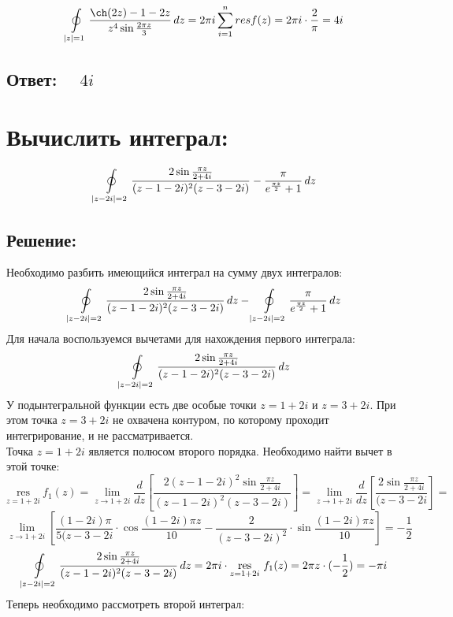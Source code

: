 \documentclass{article}
\begin{document}
         \[
        \ointop_{|z| = 1} \frac{\ch(2z) - 1 - 2z}{z^4 \sin{\frac{2\pi z}{3}}} \, dz = 2\pi i \sum\limits_{i=1}^{n} resf(z) = 2\pi i \cdot \frac{2}{\pi} = 4i
        \]
        
        
	\subsection{Ответ: $\quad 4i$}

        \section{Вычислить интеграл: 
         }
         \[
        \ointop_{|z - 2i| = 2} \frac{2\sin{\frac{\pi z}{2 + 4i}}}{(z - 1 - 2i)^2 (z - 3 - 2i)} - \frac{\pi}{e^{\frac{\pi z}{2}} + 1} \, dz
        \]
        \subsection{Решение:}
        Необходимо разбить имеющийся интеграл на сумму двух интегралов:
        \[
        \ointop_{|z - 2i| = 2} \frac{2\sin{\frac{\pi z}{2 + 4i}}}{(z - 1 - 2i)^2 (z - 3 - 2i)}\, dz - \ointop_{|z - 2i| = 2}  \frac{\pi}{e^{\frac{\pi z}{2}} + 1} \, dz
        \]
        Для начала воспользуемся вычетами для нахождения первого интеграла:
        \[
        \ointop_{|z - 2i| = 2} \frac{2\sin{\frac{\pi z}{2 + 4i}}}{(z - 1 - 2i)^2 (z - 3 - 2i)}\, dz 
        \]
        У подынтегральной функции есть две особые точки $z = 1 + 2i$ и $z = 3 + 2i$. При этом точка $z = 3 + 2i$ не охвачена контуром, по которому проходит интегрирование, и не рассматривается. \\
        Точка $z = 1 + 2i$ является полюсом второго порядка. Необходимо найти вычет в этой точке: 
        $$\underset{z = 1 + 2i}{\text{res}}\ f_1(z) = \lim\limits_{z\rightarrow 1 + 2i}  \frac{d}{dz} \left[ \frac{2(z - 1 - 2i)^2 \sin{\frac{\pi z}{2 + 4i}}}{(z - 1 - 2i)^2 (z - 3 - 2i)} \right] =\lim\limits_{z\rightarrow 1 + 2i}  \frac{d}{dz} \left[\frac{2\sin{\frac{\pi z}{2 + 4i}}}{(z - 3 - 2i}  \right] = $$
        $$\lim\limits_{z\rightarrow 1 + 2i} \left[ \frac{(1 - 2i)\pi}{5(z - 3 - 2i} \cdot \cos{\frac{(1 - 2i)\pi z}{10}} - \frac{2}{(z - 3 - 2i)^2}\cdot \sin{\frac{(1 - 2i)\pi z}{10}} \right]= -\frac{1}{2}  $$
         \[
        \ointop_{|z - 2i| = 2} \frac{2\sin{\frac{\pi z}{2 + 4i}}}{(z - 1 - 2i)^2 (z - 3 - 2i)}\, dz = 2\pi i \cdot \underset{z = 1 + 2i}{\text{res}}\ f_1(z) = 2\pi z \cdot ( -\frac{1}{2}) = -\pi i 
        \]
        Теперь необходимо рассмотреть второй интеграл:
\end{document}
